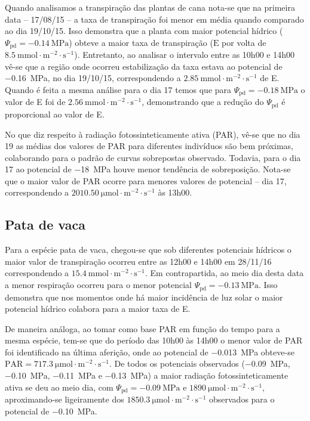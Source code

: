 \documentclass[a4paper, 12pt]{article}
\numberwithin{equation}{section}
\begin{document}
	Quando analisamos a transpiração das plantas de cana nota-se que na primeira data -- 17/08/15 -- a taxa de transpiração foi menor em média quando comparado ao dia 19/10/15. Isso demonstra que a planta com maior potencial hídrico ($\Psi_{\textrm{pd}}=\SI{-0.14}{\mega\pascal}$) obteve a maior taxa de transpiração ($\textrm{E}$ por volta de $\SI{8.5}{\milli\mole\cdot\meter^{-2}\cdot\second^{-1}}$). Entretanto, ao analisar o intervalo entre as 10h00 e 14h00 vê-se que a região onde ocorreu estabilização da taxa estava ao potencial de \SI{-.16}{\mega\pascal}, no dia 19/10/15, correspondendo a $\SI{2.85}{\milli\mole\cdot\meter^{-2}\cdot\second^{-1}}$ de E. Quando é feita a mesma análise para o dia 17 temos que para $\Psi_{\textrm{pd}}=\SI{-0.18}{\mega\pascal}$ o valor de E foi de $\SI{2.56}{\milli\mole\cdot\meter^{-2}\cdot\second^{-1}}$, demonstrando que a redução do $\Psi_{\textrm{pd}}$ é proporcional ao valor de E. 
	
	No que diz respeito à radiação fotossinteticamente ativa (PAR), vê-se que no dia 19 as médias dos valores de PAR para diferentes indivíduos são bem próximas, colaborando para o padrão de curvas sobrepostas observado. Todavia, para o dia 17 ao potencial de \SI{-18}{\mega\pascal} houve menor tendência de sobreposição. Nota-se que o maior valor de PAR ocorre para menores valores de potencial -- dia 17, correspondendo a $\SI{2010.50}{\micro\mole\cdot\meter^{-2}\cdot\second^{-1}}$ às 13h00.
	
	\subsection{Pata de vaca}
	Para a espécie pata de vaca, chegou-se que sob diferentes potenciais hídricos o maior valor de transpiração ocorreu entre as 12h00 e 14h00 em 28/11/16 correspondendo a $\SI{15.4}{\milli\mole\cdot\meter^{-2}\cdot\second^{-1}}$. Em contrapartida, ao meio dia desta data a menor respiração ocorreu para o menor potencial $\Psi_{\textrm{pd}}=\SI{-0.13}{\mega\pascal}$. Isso demonstra que nos momentos onde há maior incidência de luz solar o maior potencial hídrico colabora para a maior taxa de E.
	
	De maneira análoga, ao tomar como base PAR em função do tempo para a mesma espécie, tem-se que do período das 10h00 às 14h00 o menor valor de PAR foi identificado na última aferição, onde ao potencial de \SI{-.013}{\mega\pascal} obteve-se $\textrm{PAR}=\SI{717.3}{\micro\mole\cdot\meter^{-2}\cdot\second^{-1}}$. De todos os potenciais observados (\SI{-.09}{\mega\pascal}, \SI{-.10}{\mega\pascal}, \SI{-.11}{\mega\pascal} e \SI{-.13}{\mega\pascal}) a maior radiação fotossinteticamente ativa se deu ao meio dia, com $\Psi_{\textrm{pd}}=\SI{-0.09}{\mega\pascal}$ e $\SI{1890}{\micro\mole\cdot\meter^{-2}\cdot\second^{-1}}$, aproximando-se ligeiramente dos $\SI{1850.3}{\micro\mole\cdot\meter^{-2}\cdot\second^{-1}}$ observados para o potencial de \SI{-.10}{\mega\pascal}.
	
\end{document}

